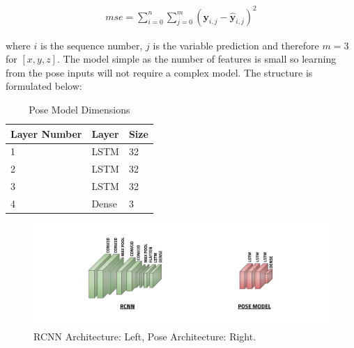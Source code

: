 \documentclass[11pt,twoside]{report}
\begin{document}
\begin{equation}
\begin{aligned}
mse = 
\sum_{i=0}^{n}\sum_{j=0}^{m} (\mathbf{y}_{i,j}-\hat{\mathbf{y}}_{i,j})^{2}
\end{aligned}
\label{pose_loss}
\end{equation}

where $i$ is the sequence number, $j$ is the variable prediction and therefore $m=3$ for $[x,y,z]$. The model simple as the number of features is small so learning from the pose inputs will not require a complex model. The structure is formulated below:

\noindent \begin{table}[h!]
	\centering
	\begin{tabular}{|p{3.5cm}|p{3.5cm}|p{3.5cm}|}
		\hline
		\textbf{Layer Number}&\textbf{Layer} & \textbf{Size}                                  \\ \hline
		1  & LSTM   &   32     \\ \hline
		2  & LSTM   &   32     \\ \hline
		3  & LSTM   &   32    \\ \hline
		4  & Dense  &   3    \\ \hline		
	\end{tabular}
	\caption{Pose Model Dimensions}
\end{table}

\noindent \begin{figure}[h!]
	\includegraphics[width = 1.0\hsize]{figures/Networks.png}
	\caption{RCNN Architecture: Left, Pose Architecture: Right.}
	\label{network_architecture}
\end{figure}
\end{document}

